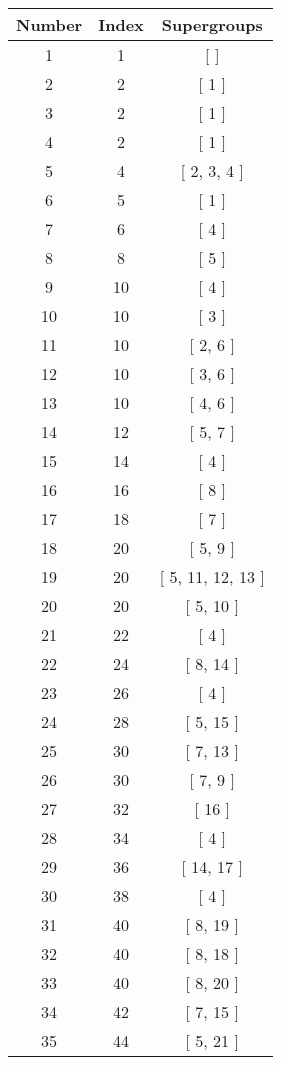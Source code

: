 \begin{center}
\begin{longtable}[H]{|| c c c ||}
\hline
Number & Index & Supergroups \\ 
\hline
1 & 1 & [ ] \\ 
\hline
2 & 2 & [ 1 ] \\ 
\hline
3 & 2 & [ 1 ] \\ 
\hline
4 & 2 & [ 1 ] \\ 
\hline
5 & 4 & [ 2, 3, 4 ] \\ 
\hline
6 & 5 & [ 1 ] \\ 
\hline
7 & 6 & [ 4 ] \\ 
\hline
8 & 8 & [ 5 ] \\ 
\hline
9 & 10 & [ 4 ] \\ 
\hline
10 & 10 & [ 3 ] \\ 
\hline
11 & 10 & [ 2, 6 ] \\ 
\hline
12 & 10 & [ 3, 6 ] \\ 
\hline
13 & 10 & [ 4, 6 ] \\ 
\hline
14 & 12 & [ 5, 7 ] \\ 
\hline
15 & 14 & [ 4 ] \\ 
\hline
16 & 16 & [ 8 ] \\ 
\hline
17 & 18 & [ 7 ] \\ 
\hline
18 & 20 & [ 5, 9 ] \\ 
\hline
19 & 20 & [ 5, 11, 12, 13 ] \\ 
\hline
20 & 20 & [ 5, 10 ] \\ 
\hline
21 & 22 & [ 4 ] \\ 
\hline
22 & 24 & [ 8, 14 ] \\ 
\hline
23 & 26 & [ 4 ] \\ 
\hline
24 & 28 & [ 5, 15 ] \\ 
\hline
25 & 30 & [ 7, 13 ] \\ 
\hline
26 & 30 & [ 7, 9 ] \\ 
\hline
27 & 32 & [ 16 ] \\ 
\hline
28 & 34 & [ 4 ] \\ 
\hline
29 & 36 & [ 14, 17 ] \\ 
\hline
30 & 38 & [ 4 ] \\ 
\hline
31 & 40 & [ 8, 19 ] \\ 
\hline
32 & 40 & [ 8, 18 ] \\ 
\hline
33 & 40 & [ 8, 20 ] \\ 
\hline
34 & 42 & [ 7, 15 ] \\ 
\hline
35 & 44 & [ 5, 21 ] \\ 

\end{longtable}
\end{center}
